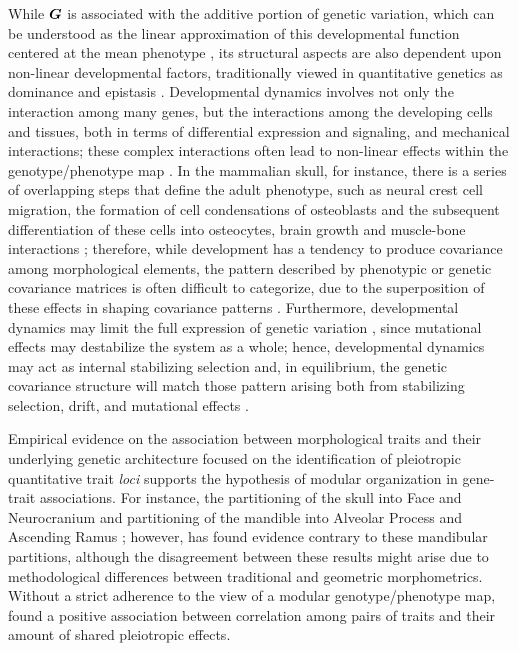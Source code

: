\documentclass [twocolumn, natbib, nospthms, 10pt] {svjour3}
\begin{document}
While $\boldsymbol{G}$ is associated with the additive portion of genetic
variation, which can be understood as the linear approximation of this
developmental function centered at the mean phenotype
\citep{wagner_eigenvalue_1984}, its structural aspects are also
dependent upon non-linear developmental factors, traditionally viewed
in quantitative genetics as dominance and epistasis
\citep{wolf_developmental_2001}. Developmental dynamics involves not
only the interaction among many genes, but the interactions among the
developing cells and tissues, both in terms of differential expression
and signaling, and mechanical interactions; these complex interactions
often lead to non-linear effects within the genotype/phenotype map
\citep{turing_chemical_1952, polly_developmental_2008,
  krupinski_simulating_2011, tiedemann_dynamic_2012,
  watson_evolution_2013}. In the mammalian skull, for instance, there
is a series of overlapping steps that define the adult phenotype, such
as neural crest cell migration, the formation of cell condensations of
osteoblasts and the subsequent differentiation of these cells into
osteocytes, brain growth and muscle-bone interactions
\citep{hallgrimsson_mouse_2008, franz-odendaal_epigenetics_2011};
therefore, while development has a tendency to produce covariance
among morphological elements, the pattern described by phenotypic or
genetic covariance matrices is often difficult to categorize, due to
the superposition of these effects in shaping covariance patterns
\citep{hallgrimsson_deciphering_2009,
  roseman_phenotypic_2009}. Furthermore, developmental dynamics may
limit the full expression of genetic variation
\citep{hallgrimsson_deciphering_2009}, since mutational effects may
destabilize the system as a whole; hence, developmental dynamics may
act as internal stabilizing selection
\citep{cheverud_quantitative_1984} and, in equilibrium, the genetic
covariance structure will match those pattern arising both from
stabilizing selection, drift, and mutational effects
\citep{lande_genetic_1980}.

Empirical evidence on the association between morphological traits and
their underlying genetic architecture focused on the identification of
pleiotropic quantitative trait \emph{loci} supports the hypothesis of
modular organization in gene-trait associations. For instance, the
partitioning of the skull into Face and Neurocranium
\citep{leamy_quantitative_1999} and partitioning of the mandible into
Alveolar Process and Ascending Ramus \citep{cheverud_pleiotropic_1997,
  mezey_is_2000, cheverud_modular_2006}; however,
\citet{klingenberg_integration_2004} has found evidence contrary to
these mandibular partitions, although the disagreement between these
results might arise due to methodological differences between
traditional and geometric morphometrics. Without a strict adherence to
the view of a modular genotype/phenotype map, \citet
{roseman_phenotypic_2009} found a positive association between
correlation among pairs of traits and their amount of shared
pleiotropic effects.
\end{document}
